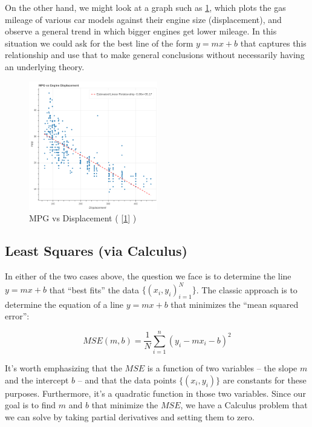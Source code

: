 \documentclass[]{article}
\begin{document}
On the other hand, we might look at a graph such as
\cref{fig:mpg-vs-displacement}, which plots the gas mileage of various
car models against their engine size (displacement), and observe a
general trend in which bigger engines get lower mileage. In this
situation we could ask for the best line of the form \(y=mx+b\) that
captures this relationship and use that to make general conclusions
without necessarily having an underlying theory.

\begin{figure}
\hypertarget{fig:mpg-vs-displacement}{%
\centering
\includegraphics[width=0.5\textwidth,height=\textheight]{../img/mpg-vs-displacement.png}
\caption{MPG vs Displacement ( {[}\protect\hyperlink{ref-irvine}{1}{]}
)}\label{fig:mpg-vs-displacement}
}
\end{figure}

\hypertarget{sec:Calculus}{%
\subsection{Least Squares (via Calculus)}\label{sec:Calculus}}

In either of the two cases above, the question we face is to determine
the line \(y=mx+b\) that ``best fits'' the data
\(\{(x_i,y_i)_{i=1}^{N}\}\). The classic approach is to determine the
equation of a line \(y=mx+b\) that minimizes the ``mean squared error'':

\[ MSE(m,b) = \frac{1}{N}\sum_{i=1}^{n} (y_i-mx_i-b)^2 \]

It's worth emphasizing that the \(MSE\) is a function of two variables
-- the slope \(m\) and the intercept \(b\) -- and that the data points
\(\{(x_i,y_i)\}\) are constants for these purposes. Furthermore, it's a
quadratic function in those two variables. Since our goal is to find
\(m\) and \(b\) that minimize the \(MSE\), we have a Calculus problem
that we can solve by taking partial derivatives and setting them to
zero.
\end{document}

